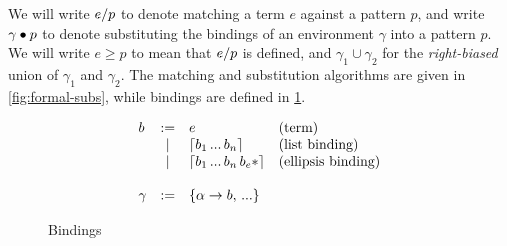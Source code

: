 We will write $e / p$ to denote matching a term $e$ against a
pattern $p$, and write $\gamma \bullet p$ to denote substituting the
bindings of an environment $\gamma$ into a pattern $p$.  We will write
$e \geq p$ to mean that $e / p$ is defined, and $\gamma_1 \cup
\gamma_2$ for the \emph{right-biased} union of $\gamma_1$ and
$\gamma_2$. The matching and substitution algorithms are given in
\ref{fig:formal-subs}, while bindings are defined in
\ref{fig:formal-bind}.

\begin{figure}[t]
\[\begin{array}{lcll}
b &:=& e                &\text{(term)} \\
  &|&  \lceil b_1\,...\,b_n \rceil  &\text{(list binding)} \\
  &|&  \lceil b_1\,...\,b_n\,b_e* \rceil &\text{(ellipsis binding)} \\ \\
\gamma &:=& \{\alpha \to b,\,...\} \\
\end{array}\]
\caption{Bindings}
\label{fig:formal-bind}
\end{figure}

